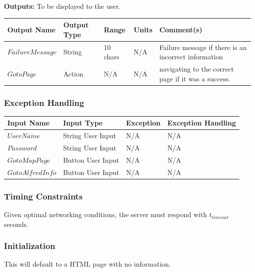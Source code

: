 \documentclass [10pt]{article}
\begin{document}
\textbf{Outputs: } To be displayed to the user.\newline
\begin{longtable}{|l|l|l|l|l|}\hline 
	\rowcolor{tableCell}\textbf{Output Name} & \textbf{Output Type} & \textbf{Range} & \textbf{Units} & \textbf{Comment(s)} \\ \hline
	$  FailureMessage $ & String & 10 chars & N/A & Failure message if there is an incorrect information  \\ \hline
	\rowcolor{tableCell}$  GotoPage $ & Action & N/A  & N/A & navigating to the correct page if it was a success. \\ \hline
\end{longtable}


\subsubsection{Exception Handling}

\begin{longtable}{|l|l|l|l|}\hline 
	\rowcolor{tableCell}\textbf{Input Name} & \textbf{Input Type} & \textbf{Exception} & \textbf{Exception Handling} \\ \hline
	$  UserName $ & String User Input & N/A & N/A  \\ \hline
	\rowcolor{tableCell}$  Password $ & String User Input & N/A & N/A\\ \hline
	$  GotoMapPage $ & Button User Input & N/A & N/A\\ \hline
	\rowcolor{tableCell}$  GotoAlfredInfo $ & Button User Input & N/A & N/A\\ \hline
\end{longtable}


\subsubsection{Timing Constraints}
Given optimal networking conditions, the server must respond with $ t_{timeout} $ seconds.


\subsubsection{Initialization}
This will default to a HTML page with no information.
\end{document}
